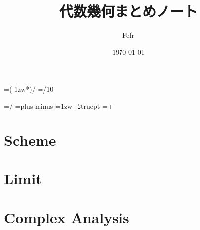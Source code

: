 \documentclass[dvipdfmx,a4paper,11pt]{jsbook}
\begin{document}
\setlength{\footskip}{20truemm}




\makeatletter
\newcount\@chars\newcount\@lines
{}                      %

\newdimen\@kanjiskip
\@kanjiskip=\dimexpr(\textwidth-1zw*\@chars)/\numexpr{}
\newdimen\@@kanjiskip
\@@kanjiskip=\dimexpr\@kanjiskip/10

\baselineskip=\dimexpr\textheight/\@lines
\kanjiskip=\@kanjiskip plus \@@kanjiskip minus \@@kanjiskip
\parindent=\dimexpr 1zw+2truept
\parindent=\dimexpr\parindent+\@kanjiskip
\makeatother




\title{代数幾何まとめノート}
\date{\today}
\author{Fefr}
\maketitle



\setcounter{tocdepth}{2}
\tableofcontents
\clearpage

\chapter{Scheme}










\clearpage
\appendix
\chapter{Limit}

\chapter{Complex Analysis}

\printindex
\end{document}
